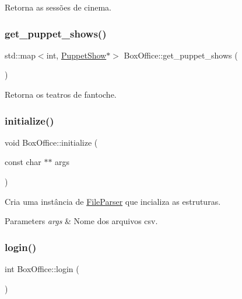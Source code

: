 Retorna as sessões de cinema. 

\mbox{\label{class_box_office_a92c8db5f58290cbfb694aa66bd83c9ee}} 
\subsubsection{\texorpdfstring{get\+\_\+puppet\+\_\+shows()}{get\_puppet\_shows()}}
{\footnotesize\ttfamily std\+::map$<$int, \hyperlink{class_puppet_show}{Puppet\+Show}$\ast$$>$ Box\+Office\+::get\+\_\+puppet\+\_\+shows (\begin{DoxyParamCaption}{ }\end{DoxyParamCaption})\hspace{0.3cm}{\ttfamily [inline]}}



Retorna os teatros de fantoche. 

\mbox{\label{class_box_office_a066af638cdd43041a0805567ff526ef3}} 
\subsubsection{\texorpdfstring{initialize()}{initialize()}}
{\footnotesize\ttfamily void Box\+Office\+::initialize (\begin{DoxyParamCaption}\item[{const char $\ast$$\ast$}]{args }\end{DoxyParamCaption})}



Cria uma instância de \hyperlink{class_file_parser}{File\+Parser} que incializa as estruturas. 


\begin{DoxyParams}{Parameters}
{\em args} & Nome dos arquivos csv. \\
\hline
\end{DoxyParams}
\mbox{\label{class_box_office_a04f554e383b6c6f462473403ae056648}} 
\subsubsection{\texorpdfstring{login()}{login()}}
{\footnotesize\ttfamily int Box\+Office\+::login (\begin{DoxyParamCaption}{ }\end{DoxyParamCaption})}



